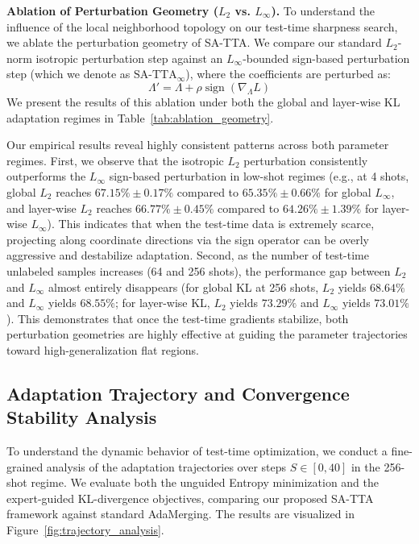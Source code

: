 \documentclass{article}
\theoremstyle{plain}
\theoremstyle{definition}
\theoremstyle{remark}
\begin{document}
\textbf{Ablation of Perturbation Geometry ($L_2$ vs. $L_{\infty}$).}
To understand the influence of the local neighborhood topology on our test-time sharpness search, we ablate the perturbation geometry of SA-TTA. We compare our standard $L_2$-norm isotropic perturbation step against an $L_{\infty}$-bounded sign-based perturbation step (which we denote as $\text{SA-TTA}_{\infty}$), where the coefficients are perturbed as:
\begin{equation}
    \Lambda' = \Lambda + \rho \operatorname{sign}(\nabla_{\Lambda} L)
\end{equation}
We present the results of this ablation under both the global and layer-wise KL adaptation regimes in Table~\ref{tab:ablation_geometry}.

Our empirical results reveal highly consistent patterns across both parameter regimes. First, we observe that the isotropic $L_2$ perturbation consistently outperforms the $L_{\infty}$ sign-based perturbation in low-shot regimes (e.g., at 4 shots, global $L_2$ reaches $67.15\% \pm 0.17\%$ compared to $65.35\% \pm 0.66\%$ for global $L_{\infty}$, and layer-wise $L_2$ reaches $66.77\% \pm 0.45\%$ compared to $64.26\% \pm 1.39\%$ for layer-wise $L_{\infty}$). This indicates that when the test-time data is extremely scarce, projecting along coordinate directions via the sign operator can be overly aggressive and destabilize adaptation. Second, as the number of test-time unlabeled samples increases (64 and 256 shots), the performance gap between $L_2$ and $L_{\infty}$ almost entirely disappears (for global KL at 256 shots, $L_2$ yields $68.64\%$ and $L_{\infty}$ yields $68.55\%$; for layer-wise KL, $L_2$ yields $73.29\%$ and $L_{\infty}$ yields $73.01\%$). This demonstrates that once the test-time gradients stabilize, both perturbation geometries are highly effective at guiding the parameter trajectories toward high-generalization flat regions.

\subsection{Adaptation Trajectory and Convergence Stability Analysis}
To understand the dynamic behavior of test-time optimization, we conduct a fine-grained analysis of the adaptation trajectories over steps $S \in [0, 40]$ in the 256-shot regime. We evaluate both the unguided Entropy minimization and the expert-guided KL-divergence objectives, comparing our proposed SA-TTA framework against standard AdaMerging. The results are visualized in Figure~\ref{fig:trajectory_analysis}.
\end{document}
